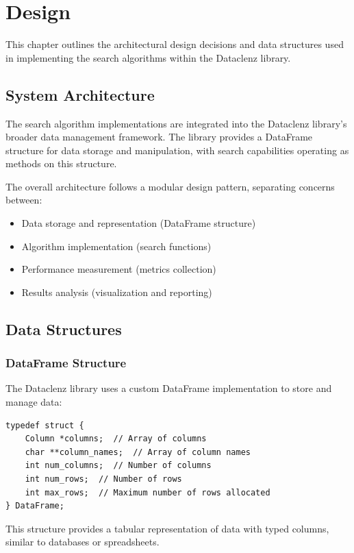 \chapter{Design}

This chapter outlines the architectural design decisions and data structures used in implementing the search algorithms within the Dataclenz library.

\section{System Architecture}

The search algorithm implementations are integrated into the Dataclenz library's broader data management framework. The library provides a DataFrame structure for data storage and manipulation, with search capabilities operating as methods on this structure.

The overall architecture follows a modular design pattern, separating concerns between:

\begin{itemize}
    \item Data storage and representation (DataFrame structure)
    \item Algorithm implementation (search functions)
    \item Performance measurement (metrics collection)
    \item Results analysis (visualization and reporting)
\end{itemize}

\section{Data Structures}

\subsection{DataFrame Structure}
The Dataclenz library uses a custom DataFrame implementation to store and manage data:

\begin{lstlisting}[style=c]
typedef struct {
    Column *columns;  // Array of columns
    char **column_names;  // Array of column names
    int num_columns;  // Number of columns
    int num_rows;  // Number of rows
    int max_rows;  // Maximum number of rows allocated
} DataFrame;
\end{lstlisting}

This structure provides a tabular representation of data with typed columns, similar to databases or spreadsheets.

